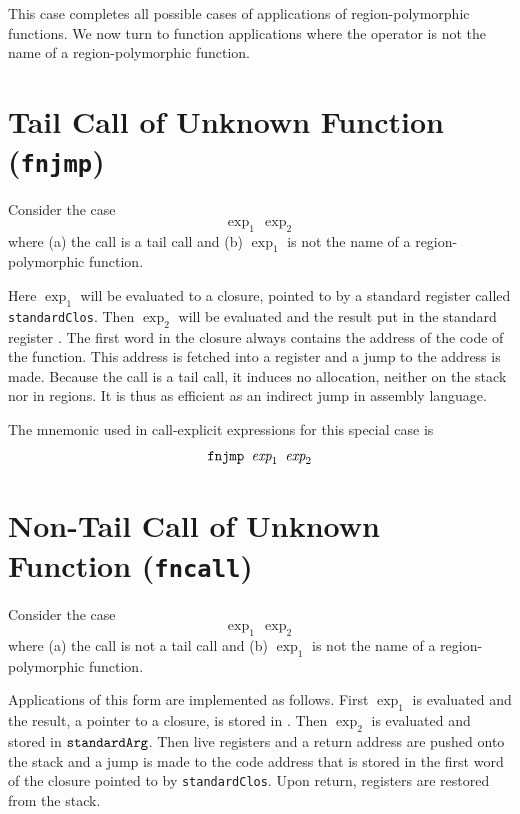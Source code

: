 \documentclass[12pt]{book}
\begin{document}
This case completes all possible cases of applications of 
region-polymorphic functions. We now turn to function applications
where the operator is not the name of a region-polymorphic function.

\section{Tail Call of Unknown Function ({\tt fnjmp})}
Consider the case
$$\exp_1\,\exp_2$$
where (a) the call is a tail call and (b) $\exp_1$ is not the name of a region-polymorphic function.

Here $\exp_1$ will be evaluated to a closure, pointed to by a standard 
register called 
{\tt standardClos}. Then $\exp_2$ will be evaluated and the result put
in the standard register .
The first word in the closure always contains the address of
the code of the function. This address is fetched into a register and a jump to
the address is made. Because the call is a tail call, it induces no allocation, neither
on the stack nor in regions. It is thus as efficient as an
indirect jump in assembly language.


The mnemonic used in call-explicit expressions for this special case is
$$\hbox{\tt fnjmp $\hbox{\it exp}_1$ $\hbox{\it exp}_2$}$$

\section{Non-Tail Call of Unknown Function ({\tt fncall})}
Consider the case
$$\exp_1\,\exp_2$$
where (a) the call is not a tail call and (b) $\exp_1$ is not the name of a region-polymorphic function.

Applications of this form are implemented as follows. First $\exp_1$ is evaluated and the result, a  pointer to a closure, 
is stored in .
Then $\exp_2$ is evaluated and stored in $\hbox{\tt standardArg}$. Then live registers and a return address
are pushed onto the stack and a jump is made to the code address that is stored in the first word of the closure
pointed to by {\tt standardClos}. Upon return, registers are restored from the stack.
\end{document}

